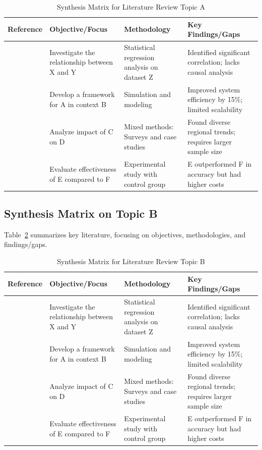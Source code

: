\documentclass[conference]{IEEEtran}
\begin{document}
\begin{table}[htbp]
	\caption{Synthesis Matrix for Literature Review Topic A}
	\label{tab:synthesis_matrix}
	\centering
	\renewcommand{\arraystretch}{1.2} %
	\begin{tabularx}{\linewidth}{|X|X|X|X|}
		\hline
		\textbf{Reference} & \textbf{Objective/Focus} & \textbf{Methodology} & \textbf{Key Findings/Gaps} \\ \hline
		\cite{ref1} & Investigate the relationship between X and Y & Statistical regression analysis on dataset Z & Identified significant correlation; lacks causal analysis \\ \hline
		\cite{ref2} & Develop a framework for A in context B & Simulation and modeling & Improved system efficiency by 15\%; limited scalability \\ \hline
		\cite{ref3} & Analyze impact of C on D & Mixed methods: Surveys and case studies & Found diverse regional trends; requires larger sample size \\ \hline
		\cite{ref4} & Evaluate effectiveness of E compared to F & Experimental study with control group & E outperformed F in accuracy but had higher costs \\ \hline
	\end{tabularx}
\end{table}


\subsection{Synthesis Matrix on Topic B}

Table~\ref{tab:synthesis_matrix} summarizes key literature, focusing on objectives, methodologies, and findings/gaps.

\begin{table}[htbp]
	\caption{Synthesis Matrix for Literature Review Topic B}
	\label{tab:synthesis_matrix}
	\centering
	\renewcommand{\arraystretch}{1.2} %
	\begin{tabularx}{\linewidth}{|X|X|X|X|}
		\hline
		\textbf{Reference} & \textbf{Objective/Focus} & \textbf{Methodology} & \textbf{Key Findings/Gaps} \\ \hline
		\textcite{ref1} & Investigate the relationship between X and Y & Statistical regression analysis on dataset Z & Identified significant correlation; lacks causal analysis \\ \hline
		\textcite{ref2} & Develop a framework for A in context B & Simulation and modeling & Improved system efficiency by 15\%; limited scalability \\ \hline
		\textcite{ref3} & Analyze impact of C on D & Mixed methods: Surveys and case studies & Found diverse regional trends; requires larger sample size \\ \hline
		\textcite{ref4} & Evaluate effectiveness of E compared to F & Experimental study with control group & E outperformed F in accuracy but had higher costs \\ \hline
	\end{tabularx}
\end{table}
\end{document}
